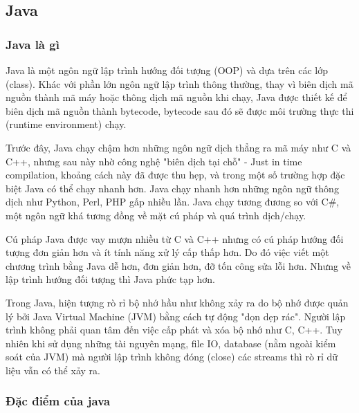 \subsection{Java}
\subsubsection{Java là gì}
\begin{center}
  \captionsetup{type=figure}
  
\end{center}

Java là một ngôn ngữ lập trình hướng đối tượng (OOP) và dựa trên các lớp (class). Khác với phần lớn ngôn ngữ lập trình thông thường, thay vì biên dịch mã nguồn thành mã máy hoặc thông dịch mã nguồn khi chạy, Java được thiết kế để biên dịch mã nguồn thành bytecode, bytecode sau đó sẽ được môi trường thực thi (runtime environment) chạy.

Trước đây, Java chạy chậm hơn những ngôn ngữ dịch thẳng ra mã máy như C và C++, nhưng sau này nhờ công nghệ "biên dịch tại chỗ" - Just in time compilation, khoảng cách này đã được thu hẹp, và trong một số trường hợp đặc biệt Java có thể chạy nhanh hơn. Java chạy nhanh hơn những ngôn ngữ thông dịch như Python, Perl, PHP gấp nhiều lần. Java chạy tương đương so với C\#, một ngôn ngữ khá tương đồng về mặt cú pháp và quá trình dịch/chạy.

Cú pháp Java được vay mượn nhiều từ C và C++ nhưng có cú pháp hướng đối tượng đơn giản hơn và ít tính năng xử lý cấp thấp hơn. Do đó việc viết một chương trình bằng Java dễ hơn, đơn giản hơn, đỡ tốn công sửa lỗi hơn. Nhưng về lập trình hướng đối tượng thì Java phức tạp hơn.

Trong Java, hiện tượng rò rỉ bộ nhớ hầu như không xảy ra do bộ nhớ được quản lý bởi Java Virtual Machine (JVM) bằng cách tự động "dọn dẹp rác". Người lập trình không phải quan tâm đến việc cấp phát và xóa bộ nhớ như C, C++. Tuy nhiên khi sử dụng những tài nguyên mạng, file IO, database (nằm ngoài kiểm soát của JVM) mà người lập trình không đóng (close) các streams thì rò rỉ dữ liệu vẫn có thể xảy ra.

\subsubsection{Đặc điểm của java}

